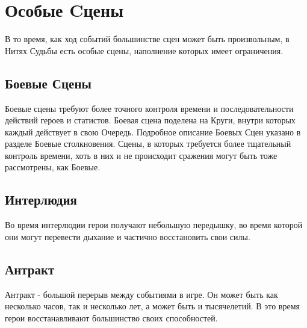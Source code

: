 \section{Особые Cцены}
В то время, как ход событий большинстве сцен может быть произвольным, в Нитях Судьбы есть особые сцены, наполнение которых имеет ограничения.
\subsection{Боевые Сцены}
Боевые сцены требуют более точного контроля времени и последовательности действий героев и статистов. Боевая сцена поделена на Круги, внутри которых каждый действует в свою Очередь. Подробное описание Боевых Сцен указано в разделе Боевые столкновения.
\newline Сцены, в которых требуется более тщательный контроль времени, хоть в них и не происходит сражения могут быть тоже рассмотрены, как Боевые.
\subsection{Интерлюдия}
Во время интерлюдии герои получают небольшую передышку, во время которой они могут перевести дыхание и частично восстановить свои силы.
\subsection{Антракт}
Антракт - большой перерыв между событиями в игре. Он может быть как несколько часов, так и несколько лет, а может быть и тысячелетий. В это время герои восстанавливают большинство своих способностей.
